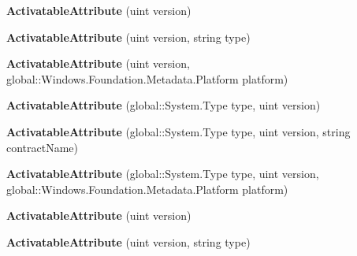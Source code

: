 \begin{DoxyCompactItemize}
{\bfseries Activatable\+Attribute} (uint version)
\item 
\mbox{\label{class_windows_1_1_foundation_1_1_metadata_1_1_activatable_attribute_a74a27250c3f2d52a6ab6bc53f78594df}} 
{\bfseries Activatable\+Attribute} (uint version, string type)
\item 
\mbox{\label{class_windows_1_1_foundation_1_1_metadata_1_1_activatable_attribute_a94c9a8436dde14583be0384f58dde314}} 
{\bfseries Activatable\+Attribute} (uint version, global\+::\+Windows.\+Foundation.\+Metadata.\+Platform platform)
\item 
\mbox{\label{class_windows_1_1_foundation_1_1_metadata_1_1_activatable_attribute_a0c631c7846b8e88aacfc234b13f25fa3}} 
{\bfseries Activatable\+Attribute} (global\+::\+System.\+Type type, uint version)
\item 
\mbox{\label{class_windows_1_1_foundation_1_1_metadata_1_1_activatable_attribute_a765085efebfd0bcd0be210e056f09933}} 
{\bfseries Activatable\+Attribute} (global\+::\+System.\+Type type, uint version, string contract\+Name)
\item 
\mbox{\label{class_windows_1_1_foundation_1_1_metadata_1_1_activatable_attribute_a406f07b4e02527c717e7403d999d4443}} 
{\bfseries Activatable\+Attribute} (global\+::\+System.\+Type type, uint version, global\+::\+Windows.\+Foundation.\+Metadata.\+Platform platform)
\item 
\mbox{\label{class_windows_1_1_foundation_1_1_metadata_1_1_activatable_attribute_acdb0cd22e6352e90c6da8ee2c53564ce}} 
{\bfseries Activatable\+Attribute} (uint version)
\item 
\mbox{\label{class_windows_1_1_foundation_1_1_metadata_1_1_activatable_attribute_a74a27250c3f2d52a6ab6bc53f78594df}} 
{\bfseries Activatable\+Attribute} (uint version, string type)

\end{DoxyCompactItemize}
